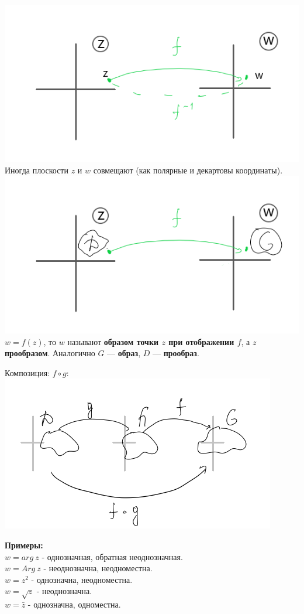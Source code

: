 \documentclass[a4paper, 12pt]{report}
\begin{document}
\includegraphics[scale = 0.5]{im2}
\\ Иногда плоскости $z$ и $w$ совмещают (как полярные и декартовы координаты).
\\ \includegraphics[scale = 0.5]{im3}
\\ $w = f(z)$, то $w$ называют \textbf{образом точки $z$ при отображении $f$}, а $z$ \textbf{прообразом}. Аналогично $G$ --- \textbf{образ}, $D$ --- \textbf{прообраз}. 
\par\bigskip Композиция: $f \circ g$:
\\ \includegraphics[scale = 0.75]{im4}
\par\bigskip
\textbf{Примеры:}
\\ $w = arg\ z$ - однозначная, обратная неоднозначная.
\\ $w = Arg\ z$ - неоднозначна, неодноместна.
\\ $w = z^2$ - однозначна, неодноместна.
\\ $w = \sqrt{z}$ - неоднозначна.
\\ $w = \bar z$ - однозначна, одноместна.
\par\bigskip
\end{document}
